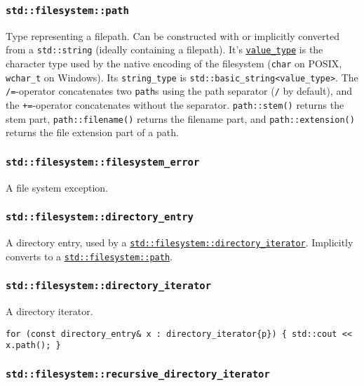 \documentclass[8pt, table, xcdraw]{article}%
\begin{document}
\subsubsection{\lstinline{std::filesystem::path}} \label{path}

Type representing a filepath. Can be constructed with or implicitly converted from a \lstinline{std::string} (ideally containing a filepath). It's \hyperref[readonlyaccesstotemplatearguments]{\lstinline{value_type}} is the character type used by the native encoding of the filesystem (\lstinline{char} on POSIX, \lstinline{wchar_t} on Windows). Its \lstinline{string_type} is \lstinline{std::basic_string<value_type>}. The \lstinline{/=}-operator concatenates two \lstinline{path}s using the path separator (\lstinline{/} by default), and the \lstinline{+=}-operator concatenates without the separator. \lstinline{path::stem()} returns the stem part, \lstinline{path::filename()} returns the filename part, and \lstinline{path::extension()} returns the file extension part of a path.

\subsubsection{\lstinline{std::filesystem::filesystem_error}}

A file system exception.

\subsubsection{\lstinline{std::filesystem::directory_entry}}

A directory entry, used by a \hyperref[directory_iterator]{\lstinline{std::filesystem::directory_iterator}}. Implicitly converts to a \hyperref[path]{\lstinline{std::filesystem::path}}.

\subsubsection{\lstinline{std::filesystem::directory_iterator}} \label{directory_iterator}

A directory iterator.

\lstinline|for (const directory_entry& x : directory_iterator{p}) { std::cout << x.path(); }|

\subsubsection{\lstinline{std::filesystem::recursive_directory_iterator}}
\end{document}
